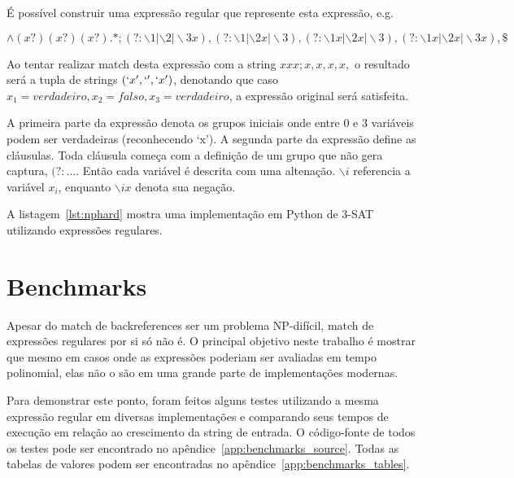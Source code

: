 \documentclass[a4paper,12pt,oneside,onecolumn]{uerj}
\begin{document}
É possível construir uma expressão regular que represente esta expressão, e.g.

\setlength\abovedisplayskip{0pt}
\begin{equation*}
\wedge (x?)(x?)(x?).*;
                   (?:\backslash 1|\backslash 2|\backslash 3x),
                   (?:\backslash 1|\backslash 2x|\backslash 3),
                   (?:\backslash 1x|\backslash 2x|\backslash 3),
                   (?:\backslash 1x|\backslash 2x|\backslash 3x), \$
\end{equation*}

Ao tentar realizar match desta expressão com a string $xxx;x,x,x,x,$ o resultado será a tupla de strings $(`x', `', `x')$, denotando que caso $x_1 = verdadeiro, x_2 = falso, x_3 = verdadeiro$, a expressão original será satisfeita.

A primeira parte da expressão denota os grupos iniciais onde entre 0 e 3 variáveis podem ser verdadeiras (reconhecendo `x'). A segunda parte da expressão define as cláusulas. Toda cláusula começa com a definição de um grupo que não gera captura, $(?:\ldots$. Então cada variável é descrita com uma altenação. $\backslash i$ referencia a variável $x_i$, enquanto $\backslash ix$ denota sua negação.

A listagem~\ref{lst:nphard} mostra uma implementação em Python de 3-SAT utilizando expressões regulares.

\vspace{0.5cm}


\section{Benchmarks}

Apesar do match de backreferences ser um problema NP-difícil, match de expressões regulares por si só não é. O principal objetivo neste trabalho é mostrar que mesmo em casos onde as expressões poderiam ser avaliadas em tempo polinomial, elas não o são em uma grande parte de implementações modernas.

Para demonstrar este ponto, foram feitos alguns testes utilizando a mesma expressão regular em diversas implementações e comparando seus tempos de execução em relação ao crescimento da string de entrada. O código-fonte de todos os testes pode ser encontrado no apêndice~\ref{app:benchmarks_source}. Todas as tabelas de valores podem ser encontradas no apêndice~\ref{app:benchmarks_tables}.
\end{document}
